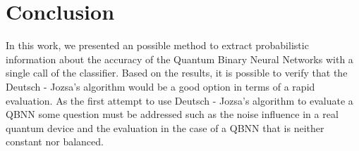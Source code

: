 \documentclass[conference]{IEEEtran}
\begin{document}
\section{Conclusion}\label{sec:conclusion}

  In this work, we presented an possible method to extract probabilistic information about the accuracy of the
  Quantum Binary Neural Networks with a single call of the classifier.
  Based on the results, it is possible to verify that the Deutsch - Jozsa's algorithm would be a good option in terms
  of a rapid evaluation.
  As the first attempt to use Deutsch - Jozsa's algorithm to evaluate a QBNN some question must be addressed such as the
  noise influence in a real quantum device and the evaluation in the case of a QBNN that is neither constant nor balanced.



\end{document}
